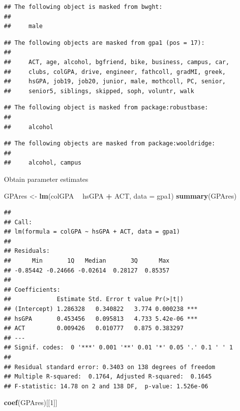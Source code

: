 \documentclass[]{book}
\newenvironment{Shaded}{\begin{snugshade}}{\end{snugshade}}
\newcommand{\DataTypeTok}[1]{\textcolor[rgb]{0.13,0.29,0.53}{#1}}
\newcommand{\DecValTok}[1]{\textcolor[rgb]{0.00,0.00,0.81}{#1}}
\newcommand{\KeywordTok}[1]{\textcolor[rgb]{0.13,0.29,0.53}{\textbf{#1}}}
\newcommand{\NormalTok}[1]{#1}
\newcommand{\OperatorTok}[1]{\textcolor[rgb]{0.81,0.36,0.00}{\textbf{#1}}}
\newcommand{\StringTok}[1]{\textcolor[rgb]{0.31,0.60,0.02}{#1}}
\begin{document}
\begin{verbatim}
## The following object is masked from bwght:
## 
##     male
\end{verbatim}

\begin{verbatim}
## The following objects are masked from gpa1 (pos = 17):
## 
##     ACT, age, alcohol, bgfriend, bike, business, campus, car,
##     clubs, colGPA, drive, engineer, fathcoll, gradMI, greek,
##     hsGPA, job19, job20, junior, male, mothcoll, PC, senior,
##     senior5, siblings, skipped, soph, voluntr, walk
\end{verbatim}

\begin{verbatim}
## The following object is masked from package:robustbase:
## 
##     alcohol
\end{verbatim}

\begin{verbatim}
## The following objects are masked from package:wooldridge:
## 
##     alcohol, campus
\end{verbatim}

Obtain parameter estimates

\begin{Shaded}
\begin{Highlighting}[]
\NormalTok{GPAres <-}\StringTok{ }\KeywordTok{lm}\NormalTok{(colGPA }\OperatorTok{~}\StringTok{ }\NormalTok{hsGPA }\OperatorTok{+}\StringTok{ }\NormalTok{ACT, }\DataTypeTok{data =}\NormalTok{ gpa1)}
\KeywordTok{summary}\NormalTok{(GPAres)}
\end{Highlighting}
\end{Shaded}

\begin{verbatim}
## 
## Call:
## lm(formula = colGPA ~ hsGPA + ACT, data = gpa1)
## 
## Residuals:
##      Min       1Q   Median       3Q      Max 
## -0.85442 -0.24666 -0.02614  0.28127  0.85357 
## 
## Coefficients:
##             Estimate Std. Error t value Pr(>|t|)    
## (Intercept) 1.286328   0.340822   3.774 0.000238 ***
## hsGPA       0.453456   0.095813   4.733 5.42e-06 ***
## ACT         0.009426   0.010777   0.875 0.383297    
## ---
## Signif. codes:  0 '***' 0.001 '**' 0.01 '*' 0.05 '.' 0.1 ' ' 1
## 
## Residual standard error: 0.3403 on 138 degrees of freedom
## Multiple R-squared:  0.1764, Adjusted R-squared:  0.1645 
## F-statistic: 14.78 on 2 and 138 DF,  p-value: 1.526e-06
\end{verbatim}

\begin{Shaded}
\begin{Highlighting}[]
\KeywordTok{coef}\NormalTok{(GPAres)[[}\DecValTok{1}\NormalTok{]]}
\end{Highlighting}
\end{Shaded}
\end{document}
